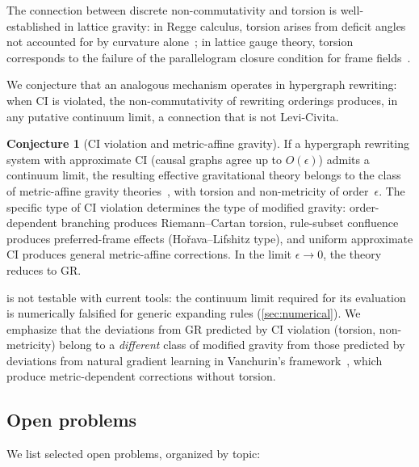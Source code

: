 \documentclass[11pt]{article}
\theoremstyle{definition}
\newtheorem{conjecture}[theorem]{Conjecture}
\theoremstyle{remark}
\begin{document}
The connection between discrete non-commutativity and torsion is
well-established in lattice gravity: in Regge calculus, torsion arises
from deficit angles not accounted for by curvature
alone~\cite{Caselle1989,Drummond1986}; in lattice gauge theory, torsion
corresponds to the failure of the parallelogram closure condition for
frame fields~\cite{MenottiPelissetto1987}.

We conjecture that an analogous mechanism operates in hypergraph
rewriting: when CI is violated, the non-commutativity of rewriting
orderings produces, in any putative continuum limit, a connection that
is not Levi-Civita.

\begin{conjecture}[CI violation and metric-affine gravity]
\label{conj:CI-MAG}
If a hypergraph rewriting system with approximate CI (causal graphs
agree up to $O(\epsilon)$) admits a continuum limit, the resulting
effective gravitational theory belongs to the class of metric-affine
gravity theories~\cite{HehlMcCreaMielkeNeeman1995}, with torsion and
non-metricity of order~$\epsilon$.
The specific type of CI violation determines the type of modified
gravity: order-dependent branching produces Riemann--Cartan torsion,
rule-subset confluence produces preferred-frame
effects (Ho\v{r}ava--Lifshitz type), and uniform approximate CI
produces general metric-affine corrections.
In the limit $\epsilon \to 0$, the theory reduces to GR.
\end{conjecture}

 is not testable with current tools: the continuum
limit required for its evaluation is numerically falsified for generic
expanding rules (\cref{sec:numerical}).
We emphasize that the deviations from GR predicted by CI violation
(torsion, non-metricity) belong to a \emph{different} class of
modified gravity from those predicted by deviations from natural
gradient learning in Vanchurin's
framework~\cite{Vanchurin2025,Vanchurin2025CGD}, which produce
metric-dependent corrections without torsion.

\subsection{Open problems}
\label{sec:open-problems}

We list selected open problems, organized by topic:
\end{document}
